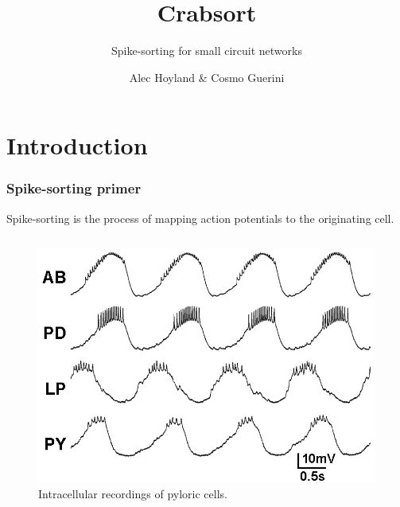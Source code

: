 \documentclass{beamer}
\title{Crabsort}
\subtitle{Spike-sorting for small circuit networks}
\author{Alec Hoyland & Cosmo Guerini}
\institute[CSN]{Center for Systems Neuroscience}
\begin{document}

\begin{frame}
  \titlepage
\end{frame}


\section{Introduction}


\begin{frame}
  \frametitle{Spike-sorting primer}

  Spike-sorting is the process of mapping action potentials to the originating cell.

  \begin{columns}

    \begin{figure}
      \includegraphics[width=\textwidth]{gfx/pyloric.jpeg}
      \centering
      \caption{Intracellular recordings of pyloric cells.}
      \label{fig:intracellular}
    \end{figure}



\end{columns}
\end{frame}
\end{document}
